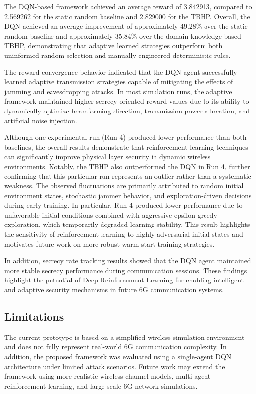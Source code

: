 \documentclass[conference]{IEEEtran}
\begin{document}
The DQN-based framework achieved an average reward of 3.842913, compared to 2.569262 for the static random baseline and 2.829000 for the TBHP. Overall, the DQN achieved an average improvement of approximately 49.28\% over the static random baseline and approximately 35.84\% over the domain-knowledge-based TBHP, demonstrating that adaptive learned strategies outperform both uninformed random selection and manually-engineered deterministic rules.


The reward convergence behavior indicated that the DQN agent successfully learned adaptive transmission strategies capable of mitigating the effects of jamming and eavesdropping attacks. In most simulation runs, the adaptive framework maintained higher secrecy-oriented reward values due to its ability to dynamically optimize beamforming direction, transmission power allocation, and artificial noise injection.


Although one experimental run (Run 4) produced lower performance than both baselines, the overall results demonstrate that reinforcement learning techniques can significantly improve physical layer security in dynamic wireless environments. Notably, the TBHP also outperformed the DQN in Run 4, further confirming that this particular run represents an outlier rather than a systematic weakness. The observed fluctuations are primarily attributed to random initial environment states, stochastic jammer behavior, and exploration-driven decisions during early training.
In particular, Run 4 produced lower performance due to unfavorable initial conditions combined with aggressive epsilon-greedy exploration, which temporarily degraded learning stability. This result highlights the sensitivity of reinforcement learning to highly adversarial initial states and motivates future work on more robust warm-start training strategies.

In addition, secrecy rate tracking results showed that the DQN agent maintained more stable secrecy performance during communication sessions. These findings highlight the potential of Deep Reinforcement Learning for enabling intelligent and adaptive security mechanisms in future 6G communication systems.

\subsection{Limitations}

The current prototype is based on a simplified wireless simulation environment and does not fully represent real-world 6G communication complexity. In addition, the proposed framework was evaluated using a single-agent DQN architecture under limited attack scenarios. Future work may extend the framework using more realistic wireless channel models, multi-agent reinforcement learning, and large-scale 6G network simulations.
\end{document}
